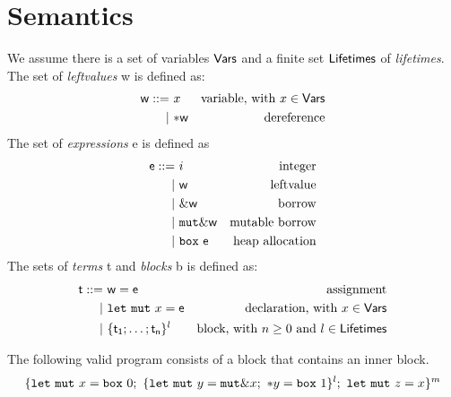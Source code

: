 \section{Semantics}\label{sec:semantics}

\begin{definition}
  We assume there is a set of variables $\mathsf{Vars}$
  and a finite set $\mathsf{Lifetimes}$ of \emph{lifetimes}.
  The set of \emph{leftvalues} \textsf{w} is defined as:
  \begin{align*}
    \mathsf{w} ::= &\ x & \text{variable, with $x\in\mathsf{Vars}$}\\
    | &\ \mathtt{*}\mathsf{w} & \text{dereference}
  \end{align*}
  The set of \emph{expressions} \textsf{e} is defined as
  \begin{align*}
    \mathsf{e} ::= &\ i & \text{integer}\\
    | &\ \mathsf{w} & \text{leftvalue}\\
    | &\ \&\mathsf{w} & \text{borrow}\\
    | &\ \mathtt{mut}\&\mathsf{w} & \text{mutable borrow}\\
    | &\ \mathtt{box}\ \mathsf{e} & \text{heap allocation}
  \end{align*}
  The sets of \emph{terms} \textsf{t} and \emph{blocks} \textsf{b}
  is defined as:
  \begin{align*}
    \mathsf{t} ::= &\ \mathsf{w}=\mathsf{e} & \text{assignment}\\
    | &\ \mathtt{let\ mut}\ x=\mathsf{e} & \text{declaration, with $x\in\mathsf{Vars}$}\\
    | &\ \{\mathsf{t_1};\ldots;\mathsf{t_n}\}^l & \text{block, with $n\ge 0$ and $l\in\mathsf{Lifetimes}$}
  \end{align*}
\end{definition}

\begin{example}\label{ex:program}
  The following valid program consists of a block that contains an inner block.
  \[
    \{
      \mathtt{let\ mut}\ x = \mathtt{box}\ 0;\
      \{\mathtt{let\ mut}\ y = \mathtt{mut}\& x;\
      \mathtt{*}y = \mathtt{box}\ 1\}^l;\
      \mathtt{let\ mut}\ z = x
    \}^m
  \]
\end{example}

